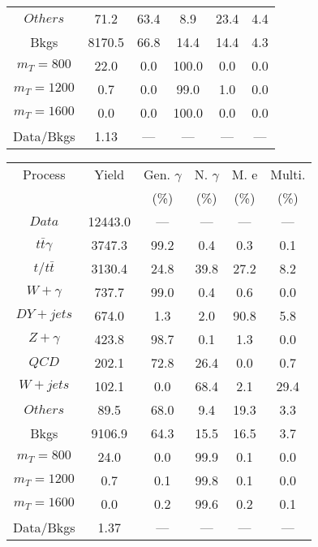 \begin{figure}
\begin{minipage}[c]{0.32\textwidth}
{\begin{tabular}{cccccc}
$ Others $ &  71.2 &  63.4 &  8.9 &  23.4 &  4.4\\
Bkgs &  8170.5 &  66.8 &  14.4 &  14.4 &  4.3\\
$ m_{T} = 800 $ &  22.0 &  0.0 &  100.0 &  0.0 &  0.0\\
$ m_{T} = 1200 $ &  0.7 &  0.0 &  99.0 &  1.0 &  0.0\\
$ m_{T} = 1600 $ &  0.0 &  0.0 &  100.0 &  0.0 &  0.0\\
Data/Bkgs &  1.13 &  --- &  --- &  --- &  ---\\
\hline
\end{tabular}
}
\end{minipage}
\begin{minipage}[c]{0.32\textwidth}
\centering
\tiny{
\begin{tabular}{cccccc}
\hline
Process & Yield & Gen. $\gamma$ & N. $\gamma$ & M. e & Multi. \\
 &  & (\%) & (\%) & (\%) & (\%)  \\
\hline
                                                                      $ Data $ &  12443.0 &  --- &  --- &  --- &  ---\\
$ t\bar{t}\gamma $ &  3747.3 &  99.2 &  0.4 &  0.3 &  0.1\\
$ t/t\bar{t} $ &  3130.4 &  24.8 &  39.8 &  27.2 &  8.2\\
$ W+\gamma $ &  737.7 &  99.0 &  0.4 &  0.6 &  0.0\\
$ DY+jets $ &  674.0 &  1.3 &  2.0 &  90.8 &  5.8\\
$ Z+\gamma $ &  423.8 &  98.7 &  0.1 &  1.3 &  0.0\\
$ QCD $ &  202.1 &  72.8 &  26.4 &  0.0 &  0.7\\
$ W+jets $ &  102.1 &  0.0 &  68.4 &  2.1 &  29.4\\
$ Others $ &  89.5 &  68.0 &  9.4 &  19.3 &  3.3\\
Bkgs &  9106.9 &  64.3 &  15.5 &  16.5 &  3.7\\
$ m_{T} = 800 $ &  24.0 &  0.0 &  99.9 &  0.1 &  0.0\\
$ m_{T} = 1200 $ &  0.7 &  0.1 &  99.8 &  0.1 &  0.0\\
$ m_{T} = 1600 $ &  0.0 &  0.2 &  99.6 &  0.2 &  0.1\\
Data/Bkgs &  1.37 &  --- &  --- &  --- &  ---\\
\hline
\end{tabular}
}
\end{minipage}
\begin{minipage}[c]{0.32\textwidth}
\centering
\tiny{
}
\end{minipage}
\end{figure}
